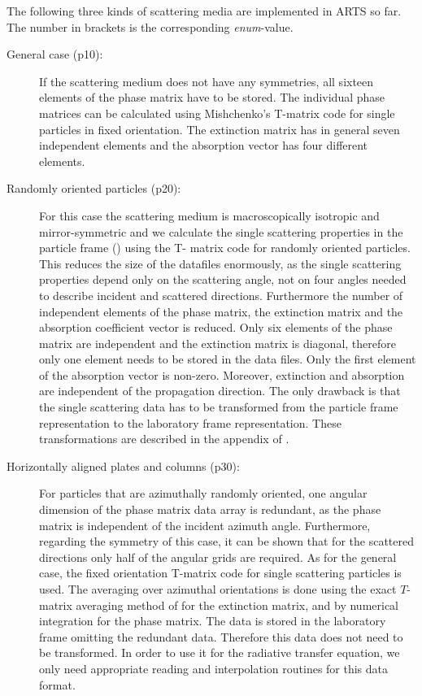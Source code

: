 The following three kinds of scattering media are implemented in ARTS
so far. The number in brackets is the corresponding \emph{enum}-value.
\begin{description}
\item[General case (p10):] If the scattering medium does not have any
  symmetries, all sixteen elements of the phase matrix have to be
  stored. The individual phase matrices can be calculated using
  Mishchenko's T-matrix code for single particles in fixed
  orientation.  The
  extinction matrix has in general seven independent elements and the
  absorption vector has four different elements.
\item[Randomly oriented particles (p20):] For this case the scattering
  medium is macroscopically isotropic and mirror-symmetric and we
  calculate the single scattering properties in the particle frame
  () using the T- matrix code for randomly
  oriented particles. This reduces the size of the datafiles
  enormously, as the single scattering properties depend only on the
  scattering angle, not on four angles needed to describe incident and
  scattered directions. Furthermore the number of independent elements
  of the phase matrix, the extinction matrix and the absorption
  coefficient vector is reduced. Only six elements of the phase matrix
  are independent and the extinction matrix is diagonal, therefore
  only one element needs to be stored in the data files. Only the
  first element of the absorption vector is non-zero. Moreover,
  extinction and absorption are independent of the propagation
  direction. The only drawback is that the single scattering data has
  to be transformed from the particle frame representation to the
  laboratory frame representation. These transformations are described
  in the appendix of \citet{emde05:_phdthesis}.
\item[Horizontally aligned plates and columns (p30):] For particles
  that are azimuthally randomly oriented, one angular dimension of the
  phase matrix data array is redundant, as the phase matrix is
  independent of the incident azimuth angle. Furthermore, regarding
  the symmetry of this case, it can be shown that for the scattered
  directions only half of the angular grids are required. As for the
  general case, the fixed orientation T-matrix code for single
  scattering particles is used. The averaging over azimuthal
  orientations is done using the exact $T$-matrix averaging method of
  \citet{mishchenko00:_light_scatt_nonsp_partic} for the extinction
  matrix, and by numerical integration for the phase matrix. The data
  is stored in the laboratory frame omitting the redundant data.
  Therefore this data does not need to be transformed. In order to use
  it for the radiative transfer equation, we only need appropriate
  reading and interpolation routines for this data format.
\end{description} 

